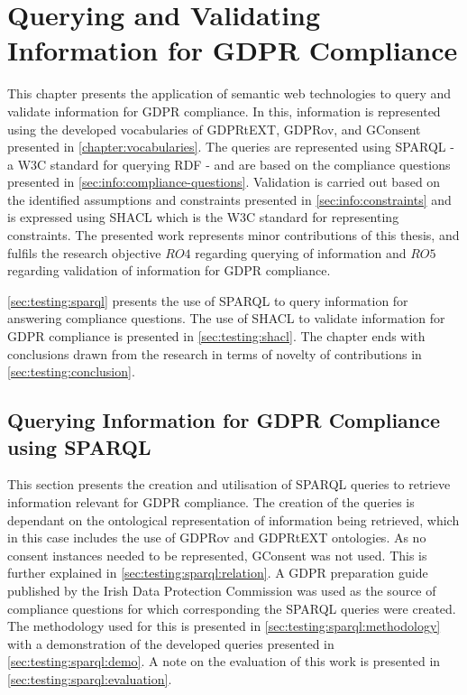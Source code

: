 \chapter{Querying and Validating Information for GDPR Compliance}
\label{chapter:testing}
This chapter presents the application of semantic web technologies to query and validate information for GDPR compliance.
In this, information is represented using the developed vocabularies of GDPRtEXT, GDPRov, and GConsent presented in \autoref{chapter:vocabularies}.
The queries are represented using SPARQL - a W3C standard for querying RDF - and are based on the compliance questions presented in \autoref{sec:info:compliance-questions}.
Validation is carried out based on the identified assumptions and constraints presented in \autoref{sec:info:constraints} and is expressed using SHACL which is the W3C standard for representing constraints.
The presented work represents minor contributions of this thesis, and fulfils the research objective $RO4$ regarding querying of information and $RO5$ regarding validation of information for GDPR compliance.

\autoref{sec:testing:sparql} presents the use of SPARQL to query information for answering compliance questions.
The use of SHACL to validate information for GDPR compliance is presented in \autoref{sec:testing:shacl}.
The chapter ends with conclusions drawn from the research in terms of novelty of contributions in \autoref{sec:testing:conclusion}.

\section{Querying Information for GDPR Compliance using SPARQL}\label{sec:testing:sparql}
This section presents the creation and utilisation of SPARQL queries to retrieve information relevant for GDPR compliance.
The creation of the queries is dependant on the ontological representation of information being retrieved, which in this case includes the use of GDPRov and GDPRtEXT ontologies.
As no consent instances needed to be represented, GConsent was not used.
 This is further explained in \autoref{sec:testing:sparql:relation}.
A GDPR preparation guide published by the Irish Data Protection Commission was used as the source of compliance questions for which corresponding the SPARQL queries were created. The methodology used for this is presented in \autoref{sec:testing:sparql:methodology} with a demonstration of the developed queries presented in \autoref{sec:testing:sparql:demo}.
A note on the evaluation of this work is presented in \autoref{sec:testing:sparql:evaluation}.

